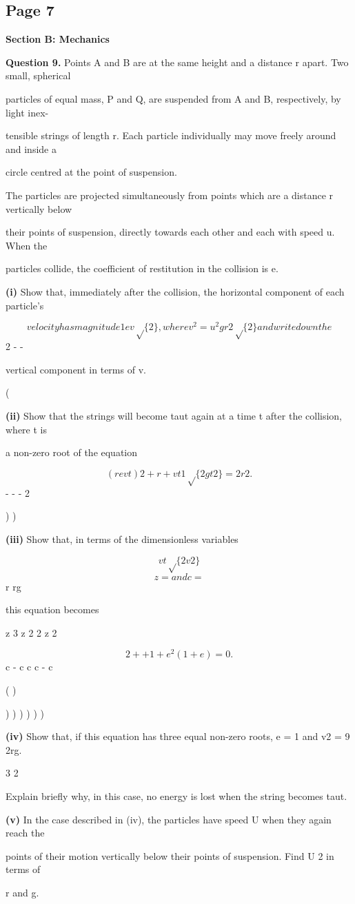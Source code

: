 \documentclass[12pt]{article}
\begin{document}
\subsection*{Page 7}
\begin{flushleft}
\bigskip\textbf{Section B: Mechanics}\par
\bigskip\textbf{Question 9.} Points A and B are at the same height and a distance  r apart. Two small, spherical\par
particles of equal mass, P and Q, are suspended from A and B, respectively, by light inex-\par
tensible strings of length r. Each particle individually may move freely around and inside a\par
circle centred at the point of suspension.\par
The particles are projected simultaneously from points which are a distance r vertically below\par
their points of suspension, directly towards each other and each with speed u. When the\par
particles collide, the coefficient of restitution in the collision is e.\par
\textbf{(i)} Show that, immediately after the collision, the horizontal component of each particle's\par
\[velocity has magnitude 1 ev\sqrt\{2\}, where v^2 = u^2 gr 2 \sqrt\{2\} and write down the\]
2 - -\par
vertical component in terms of v.\par
(\par
\textbf{(ii)} Show that the strings will become taut again at a time t after the collision, where t is\par
a non-zero root of the equation\par
\[(r evt)2 + r + vt 1 \sqrt\{2gt2\} = 2r2.\]
- - - 2\par
) )\par
\textbf{(iii)} Show that, in terms of the dimensionless variables\par
\[vt \sqrt\{2v2\}\]
\[z = and c =\]
r rg\par
this equation becomes\par
z 3 z 2 2 z 2\par
\[2 + + 1 + e^2 (1 + e) = 0.\]
c - c c c - c\par
( )\par
) ) ) ) ) )\par
\textbf{(iv)} Show that, if this equation has three equal non-zero roots, e = 1 and v2 = 9 \sqrt2rg.\par
3 2\par
Explain briefly why, in this case, no energy is lost when the string becomes taut.\par
\textbf{(v)} In the case described in (iv), the particles have speed U when they again reach the\par
points of their motion vertically below their points of suspension. Find U 2 in terms of\par
r and g.\par
\end{flushleft}
\end{document}
